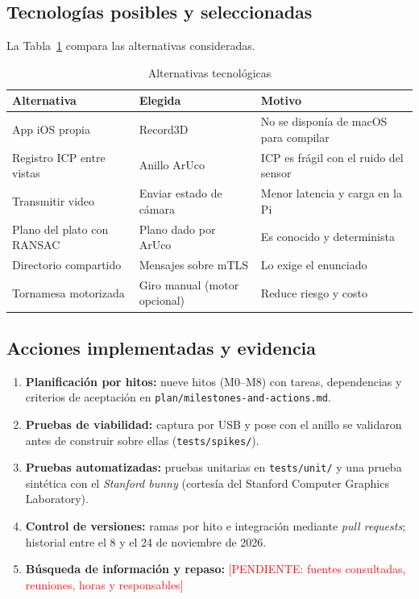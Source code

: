 \documentclass[journal]{IEEEtran}
\newcommand{\pendiente}[1]{\textcolor{red}{[PENDIENTE: #1]}}
\begin{document}
\subsection{Tecnologías posibles y seleccionadas}
La Tabla~\ref{tab:alternativas} compara las alternativas consideradas.

\begin{table}[!t]
\caption{Alternativas tecnológicas}
\label{tab:alternativas}
\centering
\footnotesize
\begin{tabularx}{\columnwidth}{XXX}
\toprule
\textbf{Alternativa} & \textbf{Elegida} & \textbf{Motivo}\\
\midrule
App iOS propia & Record3D & No se disponía de macOS para compilar\\
Registro ICP entre vistas & Anillo ArUco & ICP es frágil con el ruido del sensor\\
Transmitir video & Enviar estado de cámara & Menor latencia y carga en la Pi\\
Plano del plato con RANSAC & Plano dado por ArUco & Es conocido y determinista\\
Directorio compartido & Mensajes sobre mTLS & Lo exige el enunciado\\
Tornamesa motorizada & Giro manual (motor opcional) & Reduce riesgo y costo\\
\bottomrule
\end{tabularx}
\end{table}

\subsection{Acciones implementadas y evidencia}
\begin{enumerate}
  \item \textbf{Planificación por hitos:} nueve hitos (M0--M8) con tareas,
        dependencias y criterios de aceptación en
        \texttt{plan/milestones-and-actions.md}.
  \item \textbf{Pruebas de viabilidad:} captura por USB y pose con el anillo se
        validaron antes de construir sobre ellas (\texttt{tests/spikes/}).
  \item \textbf{Pruebas automatizadas:} pruebas unitarias en
        \texttt{tests/unit/} y una prueba sintética con el \emph{Stanford bunny}
        (cortesía del Stanford Computer Graphics Laboratory).
  \item \textbf{Control de versiones:} ramas por hito e integración mediante
        \emph{pull requests}; historial entre el 8 y el 24 de noviembre de 2026.
  \item \textbf{Búsqueda de información y repaso:}
        \pendiente{fuentes consultadas, reuniones, horas y responsables}
\end{enumerate}
\end{document}
